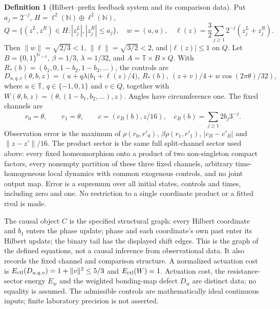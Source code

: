 \documentclass[11pt,a4paper]{article}
\theoremstyle{definition}
\newtheorem{definition}[theorem]{Definition}
\begin{document}
\begin{definition}[Hilbert--prefix feedback system and its comparison data]\label{def:hilbert-prefix-system}
Put $a_j=2^{-j}$, $H=\ell^2(\mathbb N)\oplus\ell^2(\mathbb N)$,
\[
 Q=\{(z^L,z^R)\in H:|z_j^L|,|z_j^R|\le a_j\},\quad
 w=(a,a),\quad
 \ell(z)=\frac32\sum_{j\ge1}2^{-j}(z_j^L+z_j^R).
\]
Then $\|w\|=\sqrt{2/3}<1$, $\|\ell\|=\sqrt{3/2}<2$, and $|\ell(z)|\le1$ on $Q$. Let $B=\{0,1\}^{\mathbb N_{>0}}$, $\beta=1/3$, $\lambda=1/32$, and $A=\mathbb T\times B\times Q$. With $R_*(b)=(b_1,0,1-b_2,1-b_3,\ldots)$, the controls are
\[
 D_{u,q,v}(\theta,b,z)=
 \left(u+q\lambda\bigl(b_1+\ell(z)/4\bigr),\ R_*(b),\
 (z+v)/4+w\cos(2\pi\theta)/32\right),
\]
where $u\in\mathbb T$, $q\in\{-1,0,1\}$ and $v\in Q$, together with $W(\theta,b,z)=(\theta,(1-b_1,b_2,\ldots),z)$. Angles have circumference one. The fixed channels are
\[
 r_0=\theta,\qquad r_1=\theta,\qquad
 c=(c_B(b),z/16),\quad c_B(b)=\sum_{j\ge1}2b_j3^{-j}.
\]
Observation error is the maximum of $\rho(r_0,r'_0)$, $\beta\rho(r_1,r'_1)$, $|c_B-c'_B|$ and $\|z-z'\|/16$. The product sector is the same full split-channel sector used above: every fixed homeomorphism onto a product of two non-singleton compact factors, every nonempty partition of these three fixed channels, arbitrary time-homogeneous local dynamics with common exogenous controls, and no joint output map. Error is a supremum over all initial states, controls and times, including zero and one. No restriction to a single coordinate product or a fitted rival is made.

The causal object $C$ is the specified structural graph: every Hilbert coordinate and $b_1$ enters the phase update; phase and each coordinate's own past enter its Hilbert update; the binary tail has the displayed shift edges. This is the graph of the defined equations, not a causal inference from observational data. It also records the fixed channel and comparison structure. A normalized actuation cost is $E_{\rm ctl}(D_{u,q,v})=1+\|v\|^2\le5/3$ and $E_{\rm ctl}(W)=1$. Actuation cost, the resistance-sector energy $E_w$ and the weighted bonding-map defect $D_w$ are distinct data; no equality is assumed. The admissible controls are mathematically ideal continuous inputs; finite laboratory precision is not asserted.


\end{definition}
\end{document}

